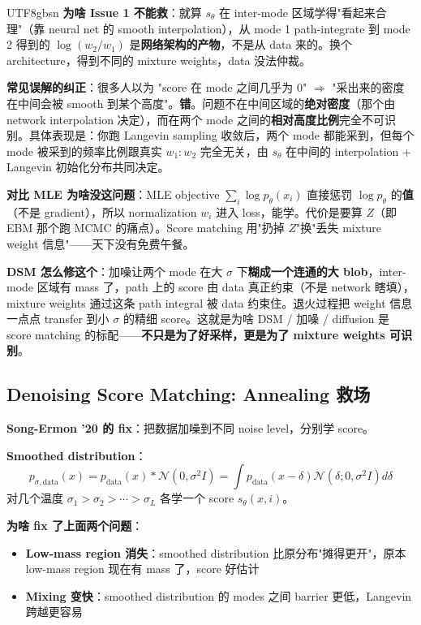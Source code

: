\documentclass[11pt]{article}
\begin{document}
\begin{CJK}{UTF8}{gbsn}
\textbf{为啥 Issue 1 不能救}：就算 $s_\theta$ 在 inter-mode 区域学得"看起来合理"（靠 neural net 的 smooth interpolation），从 mode 1 path-integrate 到 mode 2 得到的 $\log(w_2/w_1)$ 是\textbf{网络架构的产物}，不是从 data 来的。换个 architecture，得到不同的 mixture weights，data 没法仲裁。

\textbf{常见误解的纠正}：很多人以为 "score 在 mode 之间几乎为 0" $\Rightarrow$ "采出来的密度在中间会被 smooth 到某个高度"。\textbf{错}。问题不在中间区域的\textbf{绝对密度}（那个由 network interpolation 决定），而在两个 mode 之间的\textbf{相对高度比例}完全不可识别。具体表现是：你跑 Langevin sampling 收敛后，两个 mode 都能采到，但每个 mode 被采到的频率比例跟真实 $w_1 : w_2$ 完全无关，由 $s_\theta$ 在中间的 interpolation + Langevin 初始化分布共同决定。

\textbf{对比 MLE 为啥没这问题}：MLE objective $\sum_i \log p_\theta(x_i)$ 直接惩罚 $\log p_\theta$ 的\textbf{值}（不是 gradient），所以 normalization $w_i$ 进入 loss，能学。代价是要算 $Z$（即 EBM 那个跑 MCMC 的痛点）。Score matching 用"扔掉 $Z$"换"丢失 mixture weight 信息"——天下没有免费午餐。

\textbf{DSM 怎么修这个}：加噪让两个 mode 在大 $\sigma$ 下\textbf{糊成一个连通的大 blob}，inter-mode 区域有 mass 了，path 上的 score 由 data 真正约束（不是 network 瞎填），mixture weights 通过这条 path integral 被 data 约束住。退火过程把 weight 信息一点点 transfer 到小 $\sigma$ 的精细 score。这就是为啥 DSM / 加噪 / diffusion 是 score matching 的标配——\textbf{不只是为了好采样，更是为了 mixture weights 可识别}。

\subsection{Denoising Score Matching: Annealing 救场}

\textbf{Song-Ermon '20 的 fix}：把数据加噪到不同 noise level，分别学 score。

\textbf{Smoothed distribution}：
\[
p_{\sigma, \text{data}}(x) = p_{\text{data}}(x) * \mathcal{N}(0, \sigma^2 I) = \int p_{\text{data}}(x - \delta) \mathcal{N}(\delta; 0, \sigma^2 I) d\delta
\]
对几个温度 $\sigma_1 > \sigma_2 > \cdots > \sigma_L$ 各学一个 score $s_\theta(x, i)$。

\textbf{为啥 fix 了上面两个问题}：
\begin{itemize}[nosep]
  \item \textbf{Low-mass region 消失}：smoothed distribution 比原分布"摊得更开"，原本 low-mass region 现在有 mass 了，score 好估计
  \item \textbf{Mixing 变快}：smoothed distribution 的 modes 之间 barrier 更低，Langevin 跨越更容易
\end{itemize}


\end{CJK}
\end{document}
